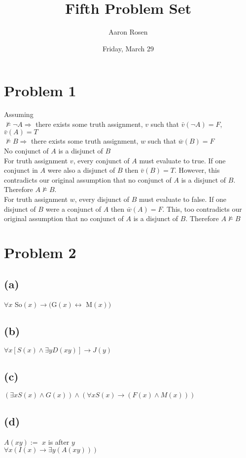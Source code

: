 \documentclass[11pt, a4paper, oneside]{article}
\begin{document}
\title{Fifth Problem Set}
\author{Aaron Rosen}
\date{Friday, March 29}
\maketitle

\section*{Problem 1}
Assuming\\ 
$\nvDash \neg A \Rightarrow$ there exists some truth assignment, $v$ such 
  that $\bar{v}(\neg A)=F$, $\bar{v}(A)=T$\\
$\nvDash B \Rightarrow$ there exists some truth assignment, $w$ such 
  that $\bar{w}(B)=F$\\
No conjunct of $A$ is a disjunct of $B$\\

For truth assignment $v$, every conjunct of $A$ must evaluate to true. 
If one conjunct in $A$ were also a disjunct of $B$ then $\bar{v}(B)=T$. 
However, this contradicts our original assumption that no conjunct of $A$ 
is a disjunct of $B$. Therefore $A \nvDash B$.\\

For truth assignment $w$, every disjunct of $B$ must evaluate to false. If 
one disjunct of $B$ were a conjunct of $A$ then $\bar{w}(A)=F$. This, too 
contradicts our original assumption that no conjunct of $A$ is a disjunct 
of $B$. Therefore $A \nvDash B$

\section*{Problem 2}
\subsection*{(a)}
$\forall x$ So$(x) \to ($G$(x) \leftrightarrow$ M$(x))$
\subsection*{(b)}
$\forall x [S(x) \land \exists y D(xy)] \to J(y)$
\subsection*{(c)}
$(\exists x S(x) \land G(x)) \land (\forall x S(x) \to (F(x) \land M(x)))$
\subsection*{(d)}
$A(xy) :=$ $x$ is after $y$\\
$\forall x (I(x) \to \exists y (A(xy)))$
\end{document}
